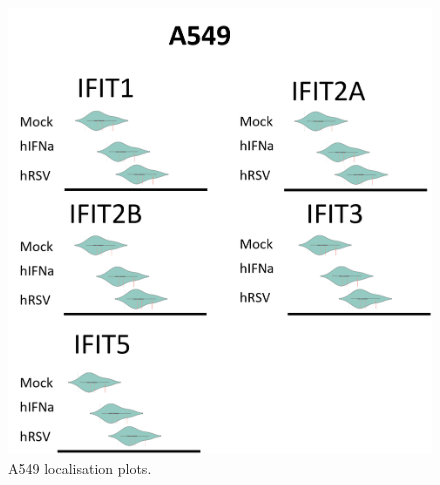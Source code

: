 \begin{figure}
    \centering
    \includegraphics[width=1\linewidth]{06. Chapter 1/Figs/03. Localisation/02. a549 plots.png}
    \caption[A549 localisation plots.]{A549 localisation plots.}
    \label{A549 localisation plots.}
\end{figure}


